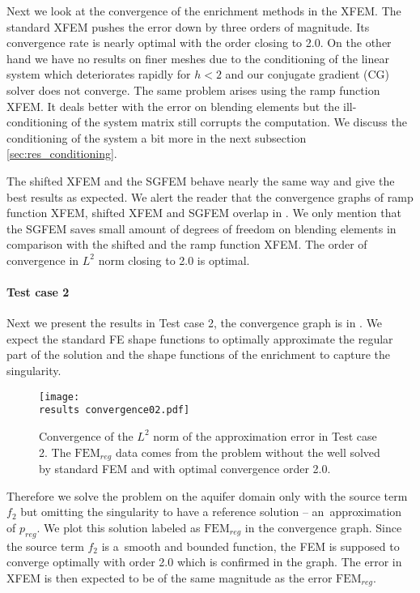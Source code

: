 Next we look at the convergence of the enrichment methods in the XFEM.
The standard XFEM pushes the error down by three orders of magnitude. Its convergence rate is nearly optimal with the order closing to 2.0.
On the other hand we have no results on finer meshes due to the conditioning of the linear system
which deteriorates rapidly for $h<2$ and our conjugate gradient (CG) solver does not converge.
The same problem arises using the ramp function XFEM. It deals better with the error on blending elements but the
ill-conditioning of the system matrix still corrupts the computation. We discuss the conditioning of the system 
a bit more in the next subsection \ref{sec:res_conditioning}.

The shifted XFEM and the SGFEM behave nearly the same way and give the best results as expected.
We alert the reader that the convergence graphs of ramp function XFEM, shifted XFEM and SGFEM overlap in .
We only mention that the SGFEM saves small amount of degrees of freedom on blending elements in comparison
with the shifted and the ramp function XFEM. The order of convergence in $L^2$ norm closing to 2.0 is optimal.


\paragraph{Test case 2}
Next we present the results in Test case 2, the convergence graph is in .
We expect the standard FE shape functions to optimally approximate the regular part of the solution
and the shape functions of the enrichment to capture the singularity.
%
\begin{figure}[!htb]
  \centering    
  \texttt{[image: \\results convergence02.pdf]}
  \caption[Convergence graph in Test case 2]{Convergence of the $L^2$ norm of the approximation error in Test case 2. The $\textrm{FEM}_{reg}$
  data comes from the problem without the well solved by standard FEM and with optimal convergence order 2.0.}
  \label{fig:convergence02}
\end{figure}
%
Therefore we solve the problem on the aquifer domain only with the source term $f_2$ but omitting the singularity
to have a reference solution -- an~approximation of $p_{reg}$. We plot this solution labeled as $\textrm{FEM}_{reg}$ in the convergence graph.
Since the source term $f_2$ is a~smooth and bounded function, the FEM is supposed to converge optimally with order 2.0
which is confirmed in the graph.
The error in XFEM is then expected to be of the same magnitude as the error $\textrm{FEM}_{reg}$.

